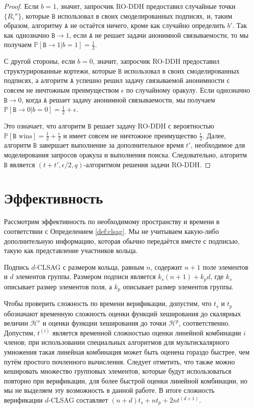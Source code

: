 \documentclass{llncs}
\newcommand{\A}{\texttt{A}}
\newcommand{\B}{\texttt{B}}
\newcommand{\Hp}{\mathcal{H}^p}
\newcommand{\Hs}{\mathcal{H}^s}
\newcommand{\prob}{\mathbb{P}}
\begin{document}
\begin{proof}
Если $b = 1$, значит, запросчик RO-DDH предоставил случайные точки $\{R_i''\}$, которые $\B$ использовал в своих смоделированных подписях, и, таким образом, алгоритму $\A$ не остаётся ничего, кроме как случайно определить $b'$. Так как однозначно $\B \to 1$, если $\A$ не решает задачи анонимной связываемости, то мы получаем $\prob[\B \to 1 | b = 1] = \frac{1}{2}$.

С другой стороны, если $b = 0$, значит, запросчик RO-DDH предоставил структурированные кортежи, которые $\B$ использовал в своих смоделированных подписях, а алгоритм $\A$ успешно решил задачу связываемой анонимности с совсем не ничтожным преимуществом $\epsilon$ по случайному оракулу. Если однозначно $\B \to 0$, когда $\A$ решает задачу анонимной связываемости, мы получаем $\prob[\B \to 0 | b = 0] = \frac{1}{2} + \epsilon$.

Это означает, что алгоритм $\B$ решает задачу RO-DDH с вероятностью $\prob[\B \text{ wins}] = \frac{1}{2} + \frac{\epsilon}{2}$ и имеет совсем не ничтожное преимущество $\frac{\epsilon}{2}$. Далее, алгоритм $\B$ завершает выполнение за дополнительное время $t'$, необходимое для моделирования запросов оракула и выполнения поиска. Следовательно, алгоритм $\B$ является $(t+t',\epsilon/2,q)$-алгоритмом решения задачи RO-DDH.
\end{proof}


\section{Эффективность}\label{sec:efficiency}
Рассмотрим эффективность по необходимому пространству и времени в соответствии с Определением \ref{def:clsag}. Мы не учитываем какую-либо дополнительную информацию, которая обычно передаётся вместе с подписью, такую как представление участников кольца.

Подпись $d$-CLSAG с размером кольца, равным $n$, содержит $n+1$ поле элементов и $d$ элементов группы. Размером подписи является $k_s(n+1) + k_p d$, где $k_s$ описывает размер элементов поля, а $k_p$ описывает размер элементов группы.

Чтобы проверить сложность по времени верификации, допустим, что $t_s$ и $t_p$ обозначают временную сложность оценки функций хеширования до скалярных величин $\Hs$ и оценки функции хеширования до точки $\Hp$, соответственно. Допустим, $t^{(i)}$ является временной сложностью оценки линейной комбинации $i$ членов; при использовании специальных алгоритмов для мультискалярного умножения \cite{straus1964addition,pippenger1980evaluation} такая линейная комбинация может быть оценена гораздо быстрее, чем путём простого почленного вычисления. Следует отметить, что также можно кешировать множество групповых элементов, которые будут использоваться повторно при верификации, для более быстрой оценки линейной комбинации, но мы не выделяем эту возможность в данной работе. В итоге сложность верификации $d$-CLSAG составляет $(n+d)t_s + nt_p + 2nt^{(d+1)}$.
\end{document}
